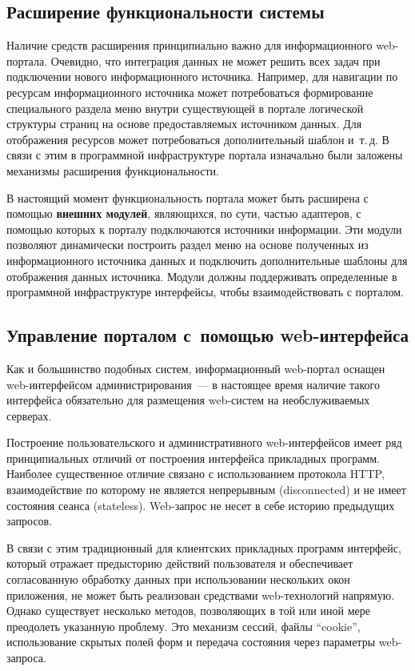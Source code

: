 \begin{multicols}{2}
\subsection{Расширение функциональности системы} %

 Наличие средств расширения принципиально важно для информационного
 web-портала. Очевидно, что интеграция данных не может решить всех задач при
подключении нового информационного источника. Например, для навигации по ресурсам
информационного источника может потребоваться формирование специального раздела
меню внут\-ри существующей в портале логической структуры страниц на основе
предоставляемых источником данных. Для отображения ресурсов может потребоваться
дополнительный шаблон и~т.\,д. В связи с этим в программной инфраструктуре портала
изначально были заложены механизмы расширения функциональности.

 В настоящий момент функциональность портала может быть расширена с
помощью \textbf{внешних модулей}, являющихся, по сути, частью адаптеров, с помощью
которых к порталу подключаются источники информации. Эти модули позволяют
динамически построить раздел меню на основе полученных из информационного
источника данных и подключить дополнительные шаблоны для отоб\-ра\-же\-ния данных
источника. Модули должны поддерживать определенные в программной инфраструктуре
интерфейсы, чтобы взаимодействовать с порталом.

\subsection{Управление порталом с~помощью web-интерфейса} %

 Как и большинство подобных систем, информационный web-портал оснащен
 web-интерфейсом администрирования~--- в настоящее время наличие такого
интерфейса обязательно для размещения web-систем на необслуживаемых серверах.

 Построение пользовательского и административного web-интерфейсов имеет ряд
принципиальных отличий от построения интерфейса прикладных программ. Наиболее
существенное отличие связано с использованием протокола HTTP, взаимодействие по
которому не является непрерывным (disconnected) и не имеет состояния сеанса (stateless).
Web-запрос не несет в себе историю предыдущих запросов.

В связи с этим традиционный
для клиентских прикладных программ интерфейс, который отражает предысторию
действий пользователя и обеспечивает согласованную обработку данных при %
исполь\-зо\-ва\-нии нескольких окон приложения, не может быть реализован средствами
 web-тех\-но\-ло\-гий напрямую. Однако существует несколько мето\-дов, позволяющих в
той или иной мере преодолеть указанную проблему. Это механизм сессий, файлы
``cookie'', использование скрытых полей форм и передача состояния через параметры
web-за\-проса.
{

}
\end{multicols}
